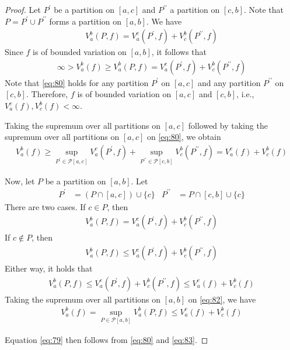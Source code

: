 \documentclass[thmcnt=section, 12pt]{my-elegantbook}
\begin{document}
\begin{proof}
    Let $P^\prime$ be a partition on $[a, c]$ and $P^{\prime\prime}$ a partition on $[c, b]$. Note that $P = P^\prime \cup P^{\prime\prime}$ forms a partition on $[a, b]$. We have
    \begin{align*}
        V_a^b(P, f) = V_a^c(P^\prime, f) + V_c^b(P^{\prime\prime}, f)
    \end{align*}
    Since $f$ is of bounded variation on $[a, b]$, it follows that
    \begin{align}
        \infty > V_a^b(f)
        \geq V_a^b(P, f)
        = V_a^c(P^\prime, f) + V_c^b(P^{\prime\prime}, f)
        \label{eq:80}
    \end{align}
    Note that \eqref{eq:80} holds for any partition $P^\prime$ on $[a, c]$ and any partition $P^{\prime\prime}$ on $[c, b]$. Therefore, $f$ is of bounded variation on $[a, c]$ and $[c, b]$, i.e., $V_a^c(f), V_c^b(f) < \infty$.

    Taking the supremum over all partitions on $[a, c]$ followed by taking the supremum over all partitions on $[a, c]$ on \eqref{eq:80}, we obtain
    \begin{align}
        V_a^b(f)
        \geq \sup_{P^\prime \in \mathcal{P}[a, c]} V_a^c(P^\prime, f)
        + \sup_{P^{\prime\prime} \in \mathcal{P}[c, b]} V_c^b(P^{\prime\prime}, f)
        = V_a^c(f) + V_c^b(f)
        \label{eq:81}
    \end{align}

    \par Now, let $P$ be a partition on $[a, b]$. Let
    \begin{align*}
        P^\prime         & = (P \cap [a, c]) \cup \{ c \} &
        P^{\prime\prime} & = P \cap [c, b] \cup \{ c \}
    \end{align*}
    There are two cases. If $c \in P$, then
    \begin{align*}
        V_a^b(P, f)
        = V_a^c(P^\prime, f) + V_c^b(P^{\prime\prime}, f)
    \end{align*}
    If $c \notin P$, then
    \begin{align*}
        V_a^b(P, f)
        \leq V_a^c(P^\prime, f) + V_c^b(P^{\prime\prime}, f)
    \end{align*}
    Either way, it holds that
    \begin{align}
        V_a^b(P, f)
        \leq V_a^c(P^\prime, f) + V_c^b(P^{\prime\prime}, f)
        \leq V_a^c(f) + V_c^b(f)
        \label{eq:82}
    \end{align}
    Taking the supremum over all partitions on $[a, b]$ on \eqref{eq:82}, we have
    \begin{align}
        V_a^b(f)
        = \sup_{P \in \mathcal{P}[a, b]} V_a^b(P, f)
        \leq V_a^c(f) + V_c^b(f)
        \label{eq:83}
    \end{align}

    Equation \eqref{eq:79} then follows from \eqref{eq:80} and \eqref{eq:83}.
\end{proof}
\end{document}
